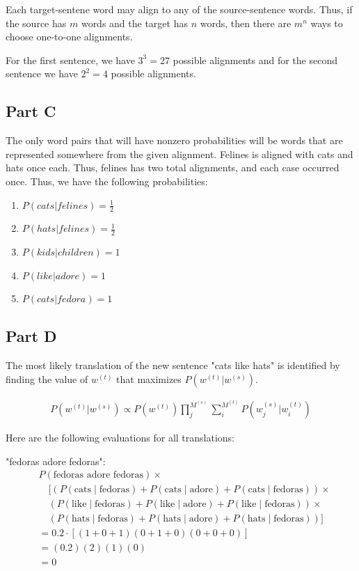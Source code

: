 \documentclass[a4 paper]{article}
\numberwithin{equation}{section}
\newcommand{\0}{\mathbf{0}}
\begin{document}
Each target-sentene word may align to any of the source-sentence words. Thus, if the source has $m$ words and the target has $n$ words, then there are $m^n$ ways to choose one-to-one alignments.

For the first sentence, we have $3^3 = 27$ possible alignments and for the second sentence we have $2^2 = 4$ possible alignments.

\subsection*{Part C}

The only word pairs that will have nonzero probabilities will be words that are represented somewhere from the given alignment. Felines is aligned with cats and hats once each. Thus, felines has two total alignments, and each case occurred once. Thus, we have the following probabilities:

\begin{enumerate}
    \item $P(cats | felines) = \frac{1}{2}$
    \item $P(hats | felines) = \frac{1}{2}$
    \item $P(kids | children) = 1$
    \item $P(like | adore) = 1$
    \item $P(cats | fedora) = 1$
\end{enumerate}

\subsection*{Part D}

The most likely translation of the new sentence "cats like hats" is identified by finding the value of $w^{(t)}$ that maximizes $P(w^{(t)} | w^{(s)})$. 

\begin{align*}
    P(w^{(t)} | w^{(s)}) \propto  P(w^{(t)})\prod_{j}^{M^{(s)}}\sum_{i}^{M^{(t)}} P(w_{j}^{(s)} | w_{i}^{(t)})
\end{align*}

Here are the following evaluations for all translations:
\newline 

"fedoras adore fedoras":
\begin{align*}
    &P(\text{fedoras adore fedoras}) \times \\
    &\quad \Big[ 
        \left( P(\text{cats} \mid \text{fedoras}) + P(\text{cats} \mid \text{adore}) + P(\text{cats} \mid \text{fedoras}) \right) \times \\
    &\quad \left( P(\text{like} \mid \text{fedoras}) + P(\text{like} \mid \text{adore}) + P(\text{like} \mid \text{fedoras}) \right) \times \\
    &\quad \left( P(\text{hats} \mid \text{fedoras}) + P(\text{hats} \mid \text{adore}) + P(\text{hats} \mid \text{fedoras}) \right) 
    \Big] \\
    &= 0.2 \cdot \left[ (1 + 0 + 1)(0 + 1 + 0)(0 + 0 + 0) \right] \\
    &= (0.2)(2)(1)(0) \\
    &= 0
\end{align*}
\newline
\end{document}
